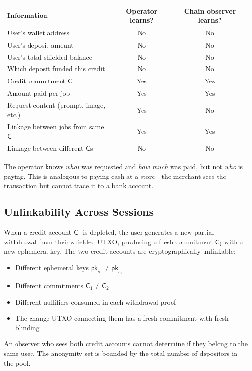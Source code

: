 \documentclass[11pt,a4paper]{article}
\theoremstyle{definition}
\begin{document}
\begin{center}
\begin{tabular}{lcc}
\hline
\textbf{Information} & \textbf{Operator learns?} & \textbf{Chain observer learns?} \\
\hline
User's wallet address & No & No \\
User's deposit amount & No & No \\
User's total shielded balance & No & No \\
Which deposit funded this credit & No & No \\
Credit commitment $\mathsf{C}$ & Yes & Yes \\
Amount paid per job & Yes & Yes \\
Request content (prompt, image, etc.) & Yes & No \\
Linkage between jobs from same $\mathsf{C}$ & Yes & Yes \\
Linkage between different $\mathsf{C}$s & No & No \\
\hline
\end{tabular}
\end{center}

The operator knows \emph{what} was requested and \emph{how much} was paid, but not \emph{who} is paying. This is analogous to paying cash at a store---the merchant sees the transaction but cannot trace it to a bank account.

\subsection{Unlinkability Across Sessions}

When a credit account $\mathsf{C}_1$ is depleted, the user generates a new partial withdrawal from their shielded UTXO, producing a fresh commitment $\mathsf{C}_2$ with a new ephemeral key. The two credit accounts are cryptographically unlinkable:
\begin{itemize}[nosep]
  \item Different ephemeral keys $\mathsf{pk}_{s_1} \neq \mathsf{pk}_{s_2}$
  \item Different commitments $\mathsf{C}_1 \neq \mathsf{C}_2$
  \item Different nullifiers consumed in each withdrawal proof
  \item The change UTXO connecting them has a fresh commitment with fresh blinding
\end{itemize}

An observer who sees both credit accounts cannot determine if they belong to the same user. The anonymity set is bounded by the total number of depositors in the pool.
\end{document}
